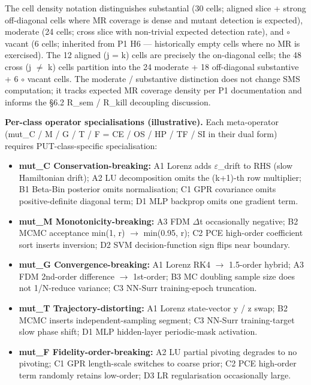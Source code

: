 \documentclass[review,12pt,authoryear]{elsarticle}
\providecommand{\tightlist}{\setlength{\itemsep}{0pt}\setlength{\parskip}{0pt}}
\begin{document}
The cell density notation distinguishes \textbullet\textbullet substantial (30 cells;
aligned slice + strong off-diagonal cells where MR coverage is dense and
mutant detection is expected), \textbullet moderate (24 cells; cross slice with
non-trivial expected detection rate), and $\circ$ vacant (6 cells; inherited
from P1 H6 --- historically empty cells where no MR is exercised). The
12 aligned (j = k) cells are precisely the on-diagonal cells; the 48
cross (j $\neq$ k) cells partition into the 24 \textbullet moderate + 18 \textbullet\textbullet
off-diagonal substantive + 6 $\circ$ vacant cells. The \textbullet moderate / \textbullet\textbullet
substantive distinction does not change SMS computation; it tracks
expected MR coverage density per P1 documentation and informs the §6.2
R\_sem / R\_kill decoupling discussion.

\textbf{Per-class operator specialisations (illustrative).} Each
meta-operator (mut\_C / M / G / T / F = CE / OS / HP / TF / SI in their
dual form) requires PUT-class-specific specialisation:

\begin{itemize}
\tightlist
\item
  \textbf{mut\_C Conservation-breaking:} A1 Lorenz adds $\varepsilon$\_drift to RHS
  (slow Hamiltonian drift); A2 LU decomposition omits the (k+1)-th row
  multiplier; B1 Beta-Bin posterior omits normalisation; C1 GPR
  covariance omits positive-definite diagonal term; D1 MLP backprop
  omits one gradient term.
\item
  \textbf{mut\_M Monotonicity-breaking:} A3 FDM $\Delta$t occasionally
  negative; B2 MCMC acceptance min(1, r) $\to$ min(0.95, r); C2 PCE
  high-order coefficient sort inserts inversion; D2 SVM
  decision-function sign flips near boundary.
\item
  \textbf{mut\_G Convergence-breaking:} A1 Lorenz RK4 $\to$ 1.5-order
  hybrid; A3 FDM 2nd-order difference $\to$ 1st-order; B3 MC doubling sample
  size does not 1/N-reduce variance; C3 NN-Surr training-epoch
  truncation.
\item
  \textbf{mut\_T Trajectory-distorting:} A1 Lorenz state-vector y / z
  swap; B2 MCMC inserts independent-sampling segment; C3 NN-Surr
  training-target slow phase shift; D1 MLP hidden-layer periodic-mask
  activation.
\item
  \textbf{mut\_F Fidelity-order-breaking:} A2 LU partial pivoting
  degrades to no pivoting; C1 GPR length-scale switches to coarse prior;
  C2 PCE high-order term randomly retains low-order; D3 LR
  regularisation occasionally large.
\end{itemize}
\end{document}
